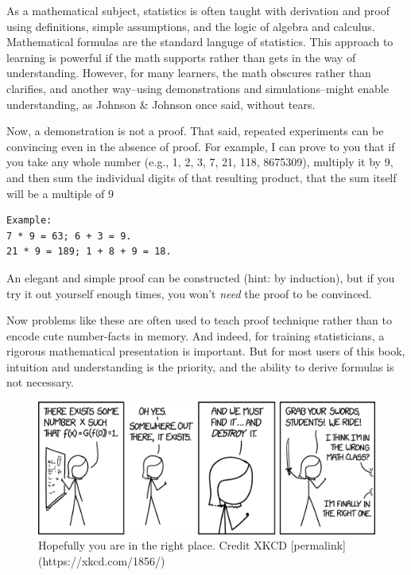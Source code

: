 \documentclass[]{book}
\begin{document}
As a mathematical subject, statistics is often taught with derivation and proof using definitions, simple assumptions, and the logic of algebra and calculus. Mathematical formulas are the standard languge of statistics. This approach to learning is powerful if the math supports rather than gets in the way of understanding. However, for many learners, the math obscures rather than clarifies, and another way--using demonstrations and simulations--might enable understanding, as Johnson \& Johnson once said, without tears.

Now, a demonstration is not a proof. That said, repeated experiments can be convincing even in the absence of proof. For example, I can prove to you that if you take any whole number (e.g., 1, 2, 3, 7, 21, 118, 8675309), multiply it by 9, and then sum the individual digits of that resulting product, that the sum itself will be a multiple of 9

\begin{verbatim}
Example: 
7 * 9 = 63; 6 + 3 = 9.
21 * 9 = 189; 1 + 8 + 9 = 18. 
\end{verbatim}

An elegant and simple proof can be constructed (hint: by induction), but if you try it out yourself enough times, you won't \emph{need} the proof to be convinced.

Now problems like these are often used to teach proof technique rather than to encode cute number-facts in memory. And indeed, for training statisticians, a rigorous mathematical presentation is important. But for most users of this book, intuition and understanding is the priority, and the ability to derive formulas is not necessary.

\begin{figure}
\includegraphics[width=17.15in]{images/existence_proof_2x} \caption{Hopefully you are in the right place. Credit XKCD  [permalink](https://xkcd.com/1856/)}\label{fig:xkcd-preamble}
\end{figure}
\end{document}
